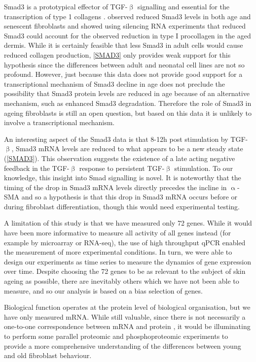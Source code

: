 \documentclass[alpha-refs]{wiley-article}
\newcommand{\tgf}{TGF-$\upbeta$}
\newcommand{\sma}{$\upalpha$-SMA}
\begin{document}
Smad3 is a prototypical effector of \tgf{} signalling and essential for the transcription of type 1 collagens \cite{Runyan2003}. \cite{Purohit2016} observed reduced Smad3 levels in both age and senescent fibroblasts and showed using silencing RNA experiments that reduced Smad3 could account for the observed reduction in type I procollagen in the aged dermis. While it is certainly feasible that less Smad3 in adult cells would cause reduced collagen production, \cref{SMAD3} only provides weak support for this hypothesis since the differences between adult and neonatal cell lines are not so profound. However, just because this data does not provide good support for a transcriptional mechanism of Smad3 decline in age does not preclude the possibility that Smad3 protein levels are reduced in age because of an alternative mechanism, such as enhanced Smad3 degradation. Therefore the role of Smad3 in ageing fibroblasts is still an open question, but based on this data it is unlikely to involve a transcriptional mechanism. 

An interesting aspect of the Smad3 data is that 8-12h post stimulation by \tgf{}, Smad3 mRNA levels are reduced to what appears to be a new steady state (\cref{SMAD3}). This observation suggests the existence of a late acting negative feedback in the \tgf{} response to persistent \tgf{} stimulation. To our knowledge, this insight into Smad signalling is novel. It is noteworthy that the timing of the drop in Smad3 mRNA levels directly precedes the incline in \sma{} and so a hypothesis is that this drop in Smad3 mRNA occurs before or during fibroblast differentiation, though this would need experimental testing. 

A limitation of this study is that we have measured only 72 genes. While it would have been more informative to measure all activity of all genes instead (for example by microarray or RNA-seq), the use of high throughput qPCR enabled the measurement of more experimental conditions. In turn, we were able to design our experiments as time series to measure the dynamics of gene expression over time. Despite choosing the 72 genes to be as relevant to the subject of skin ageing as possible, there are inevitably others which we have not been able to measure, and so our analysis is based on a bias selection of genes. 

Biological function operates at the protein level of biological organisation, but we have only measured mRNA. While still valuable, since there is not necessarily a one-to-one correspondence between mRNA and protein \citep{Liu2016}, it would be illuminating to perform some parallel proteomic and phosphoproteomic experiments to provide a more comprehensive understanding of the differences between young and old fibroblast behaviour.
\end{document}
